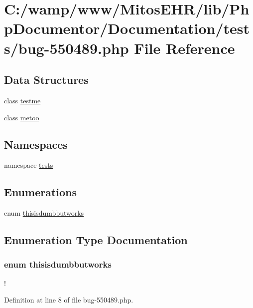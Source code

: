 \hypertarget{bug-550489_8php}{\section{\-C\-:/wamp/www/\-Mitos\-E\-H\-R/lib/\-Php\-Documentor/\-Documentation/tests/bug-\/550489.php \-File \-Reference}
\label{bug-550489_8php}
}
\subsection*{\-Data \-Structures}
\begin{DoxyCompactItemize}
\item 
class \hyperlink{classtestme}{testme}
\item 
class \hyperlink{classmetoo}{metoo}
\end{DoxyCompactItemize}
\subsection*{\-Namespaces}
\begin{DoxyCompactItemize}
\item 
namespace \hyperlink{namespacetests}{tests}
\end{DoxyCompactItemize}
\subsection*{\-Enumerations}
\begin{DoxyCompactItemize}
\item 
enum \hyperlink{bug-550489_8php_ac6506ce5e7a81b434855cb8886b0000a}{thisisdumbbutworks} 
\end{DoxyCompactItemize}


\subsection{\-Enumeration \-Type \-Documentation}
\hypertarget{bug-550489_8php_ac6506ce5e7a81b434855cb8886b0000a}{
\subsubsection[{thisisdumbbutworks}]{\setlength{\rightskip}{0pt plus 5cm}enum {\bf thisisdumbbutworks}}}\label{bug-550489_8php_ac6506ce5e7a81b434855cb8886b0000a}
! 

\-Definition at line 8 of file bug-\/550489.\-php.


